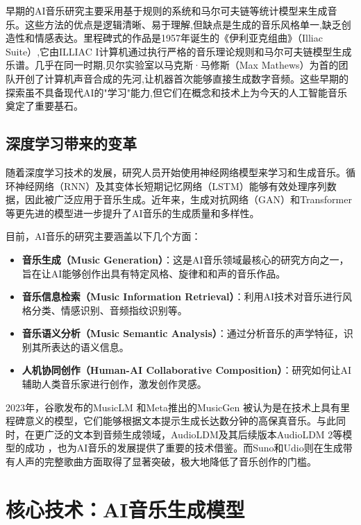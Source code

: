 \documentclass[12pt]{article}
\begin{document}
早期的AI音乐研究主要采用基于规则的系统和马尔可夫链等统计模型来生成音乐。这些方法的优点是逻辑清晰、易于理解,但缺点是生成的音乐风格单一,缺乏创造性和情感表达。里程碑式的作品是1957年诞生的《伊利亚克组曲》（Illiac Suite）\cite{illiac1957},它由ILLIAC I计算机通过执行严格的音乐理论规则和马尔可夫链模型生成乐谱。几乎在同一时期,贝尔实验室以马克斯·马修斯（Max Mathews）为首的团队开创了计算机声音合成的先河,让机器首次能够直接生成数字音频。这些早期的探索虽不具备现代AI的"学习"能力,但它们在概念和技术上为今天的人工智能音乐奠定了重要基石。

\subsection{深度学习带来的变革}

随着深度学习技术的发展，研究人员开始使用神经网络模型来学习和生成音乐。循环神经网络（RNN）及其变体长短期记忆网络（LSTM）\cite{hochreiter1997long}能够有效处理序列数据，因此被广泛应用于音乐生成。近年来，生成对抗网络（GAN）\cite{goodfellow2014generative}和Transformer\cite{vaswani2017attention}等更先进的模型进一步提升了AI音乐的生成质量和多样性。

目前，AI音乐的研究主要涵盖以下几个方面：
\begin{itemize}
    \item \textbf{音乐生成（Music Generation）}：这是AI音乐领域最核心的研究方向之一，旨在让AI能够创作出具有特定风格、旋律和和声的音乐作品。
    \item \textbf{音乐信息检索（Music Information Retrieval）}：利用AI技术对音乐进行风格分类、情感识别、音频指纹识别等。
    \item \textbf{音乐语义分析（Music Semantic Analysis）}：通过分析音乐的声学特征，识别其所表达的语义信息。
    \item \textbf{人机协同创作（Human-AI Collaborative Composition）}：研究如何让AI辅助人类音乐家进行创作，激发创作灵感。
\end{itemize}

2023年，谷歌发布的MusicLM \cite{agostinelli2023musiclm}和Meta推出的MusicGen \cite{copet2023simple}被认为是在技术上具有里程碑意义的模型，它们能够根据文本提示生成长达数分钟的高保真音乐。与此同时，在更广泛的文本到音频生成领域，AudioLDM及其后续版本AudioLDM 2等模型的成功 \cite{liu2023audioldm, liu2023audioldm2}，也为AI音乐的发展提供了重要的技术借鉴。而Suno和Udio则在生成带有人声的完整歌曲方面取得了显著突破，极大地降低了音乐创作的门槛。

\section{核心技术：AI音乐生成模型}
\end{document}
